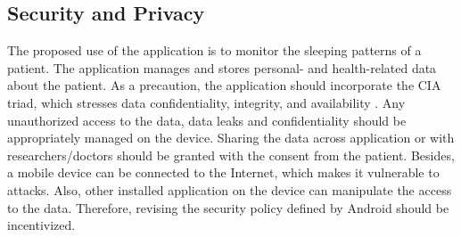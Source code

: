 \subsection{Security and Privacy}
The proposed use of the application is to monitor the sleeping patterns of a patient. The application manages and stores personal- and health-related data about the patient. As a precaution, the application should incorporate the CIA triad, which stresses data confidentiality, integrity, and availability \cite{cia}. Any unauthorized access to the data, data leaks and confidentiality should be appropriately managed on the device. Sharing the data across application or with researchers/doctors should be granted with the consent from the patient.  Besides, a mobile device can be connected to the Internet, which makes it vulnerable to attacks. Also, other installed application on the device can manipulate the access to the data. Therefore, revising the security policy defined by Android \cite{androidsecurity} should be incentivized. 